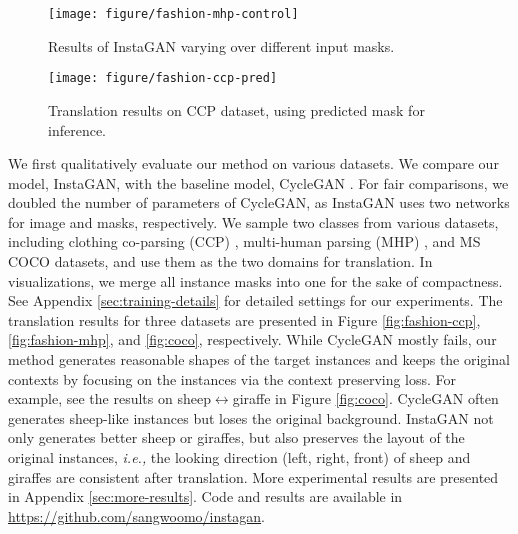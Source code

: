 \documentclass{article} \usepackage{iclr2019_conference,times}
\begin{document}
\begin{figure}[t]
    \vspace{-0.2in}
	\centering
	\texttt{[image: figure/fashion-mhp-control]}
	\caption{
	Results of InstaGAN varying over different input masks.
	} \label{fig:fashion-mhp-control}
	\vspace{0.05in}
	\texttt{[image: figure/fashion-ccp-pred]}
	\caption{
	Translation results on CCP dataset, using predicted mask for inference.
	} \label{fig:fashion-ccp-pred}
    \vspace{-0.1in}
\end{figure}


We first qualitatively evaluate our method on various datasets.
We compare our model, InstaGAN, with the baseline model, CycleGAN \citep{zhu2017unpaired}.
For fair comparisons, we doubled the number of parameters of CycleGAN, as InstaGAN uses two networks for image and masks, respectively.
We sample two classes from various datasets, including clothing co-parsing (CCP) \citep{yang2014clothing},
multi-human parsing (MHP) \citep{zhao2018understanding}, and MS COCO \citep{lin2014microsoft} datasets,
and use them as the two domains for translation.
In visualizations, we merge all instance masks into one for the sake of compactness.
See Appendix \ref{sec:training-details} for detailed settings for our experiments.
The translation results for three datasets are presented in Figure \ref{fig:fashion-ccp}, \ref{fig:fashion-mhp}, and \ref{fig:coco}, respectively.
While CycleGAN mostly fails, our method generates reasonable shapes of the target instances and keeps the original contexts by focusing on the
instances via the context preserving loss.
For example, see the results on sheep$\leftrightarrow$giraffe in Figure \ref{fig:coco}.
CycleGAN often generates sheep-like instances but loses the original background.
InstaGAN  not only generates better sheep or giraffes, but also preserves the layout of the original instances,
\textit{i.e.,} the looking direction (left, right, front) of sheep and giraffes are consistent after translation.
More experimental results are presented in Appendix \ref{sec:more-results}.
Code and results are available in \url{https://github.com/sangwoomo/instagan}.
\end{document}
